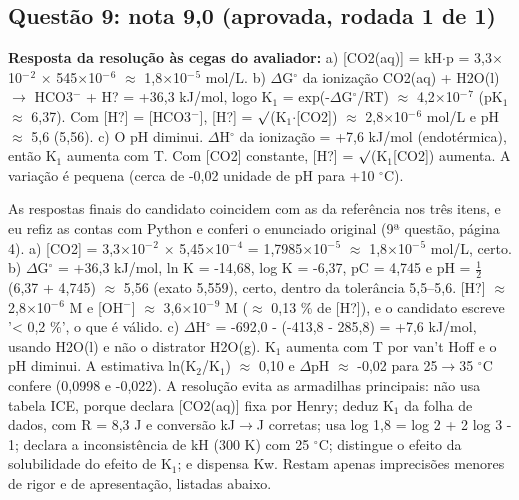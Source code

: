 \documentclass{article}%
\begin{document}
\subsection*{Questão 9: nota 9,0 (aprovada, rodada 1 de 1)}%
\textbf{Resposta da resolução às cegas do avaliador:} a) {[}CO2(aq){]} = kH$\cdot$p = 3,3$\times$10$^{-}$$^2$ $\times$ 545$\times$10$^{-}$$^{6}$ $\approx$ 1,8$\times$10$^{-}$$^{5}$ mol/L.\newline%
\newline%
b) $\Delta$G$^\circ$ da ionização CO2(aq) + H2O(l) $\to$ HCO3$^{-}$ + H? = +36,3 kJ/mol, logo K$_{1}$ = exp(-$\Delta$G$^\circ$/RT) $\approx$ 4,2$\times$10$^{-}$$^{7}$ (pK$_{1}$ $\approx$ 6,37). Com {[}H?{]} = {[}HCO3$^{-}${]}, {[}H?{]} = $\surd$(K$_{1}$$\cdot${[}CO2{]}) $\approx$ 2,8$\times$10$^{-}$$^{6}$ mol/L e pH $\approx$ 5,6 (5,56).\newline%
\newline%
c) O pH diminui. $\Delta$H$^\circ$ da ionização = +7,6 kJ/mol (endotérmica), então K$_{1}$ aumenta com T. Com {[}CO2{]} constante, {[}H?{]} = $\surd$(K$_{1}${[}CO2{]}) aumenta. A variação é pequena (cerca de -0,02 unidade de pH para +10 $^\circ$C).\par %
As respostas finais do candidato coincidem com as da referência nos três itens, e eu refiz as contas com Python e conferi o enunciado original (9ª questão, página 4). a) {[}CO2{]} = 3,3$\times$10$^{-}$$^2$ $\times$ 5,45$\times$10$^{-}$$^{4}$ = 1,7985$\times$10$^{-}$$^{5}$ $\approx$ 1,8$\times$10$^{-}$$^{5}$ mol/L, certo. b) $\Delta$G$^\circ$ = +36,3 kJ/mol, ln K = -14,68, log K = -6,37, pC = 4,745 e pH = $\frac12$(6,37 + 4,745) $\approx$ 5,56 (exato 5,559), certo, dentro da tolerância 5,5--5,6. {[}H?{]} $\approx$ 2,8$\times$10$^{-}$$^{6}$ M e {[}OH$^{-}${]} $\approx$ 3,6$\times$10$^{-}$$^{9}$ M ($\approx$ 0,13 \% de {[}H?{]}), e o candidato escreve '< 0,2 \%', o que é válido. c) $\Delta$H$^\circ$ = -692,0 - (-413,8 - 285,8) = +7,6 kJ/mol, usando H2O(l) e não o distrator H2O(g). K$_{1}$ aumenta com T por van't Hoff e o pH diminui. A estimativa ln(K$_{2}$/K$_{1}$) $\approx$ 0,10 e $\Delta$pH $\approx$ -0,02 para 25$\to$35 $^\circ$C confere (0,0998 e -0,022). A resolução evita as armadilhas principais: não usa tabela ICE, porque declara {[}CO2(aq){]} fixa por Henry; deduz K$_{1}$ da folha de dados, com R = 8,3 J e conversão kJ$\to$J corretas; usa log 1,8 = log 2 + 2 log 3 - 1; declara a inconsistência de kH (300 K) com 25 $^\circ$C; distingue o efeito da solubilidade do efeito de K$_{1}$; e dispensa Kw. Restam apenas imprecisões menores de rigor e de apresentação, listadas abaixo.%
\end{document}
